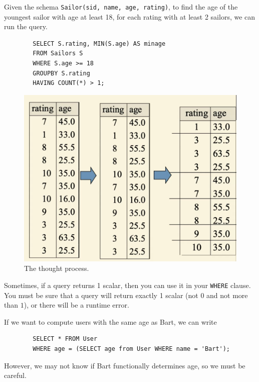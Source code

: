 \documentclass{article}
\begin{document}
    \begin{example}
      Given the schema \texttt{Sailor(sid, name, age, rating)}, to find the age of the youngest sailor with age at least 18, for each rating with at least 2 sailors, we can run the query. 
      \begin{lstlisting}
        SELECT S.rating, MIN(S.age) AS minage 
        FROM Sailors S 
        WHERE S.age >= 18
        GROUPBY S.rating 
        HAVING COUNT(*) > 1; 
      \end{lstlisting}

      \begin{figure}[H]
        \centering 
        \includegraphics[scale=0.4]{img/sailors.png}
        \caption{The thought process.} 
        \label{fig:thought}
      \end{figure}
    \end{example}

    \begin{definition}
      Sometimes, if a query returns 1 scalar, then you can use it in your \texttt{WHERE} clause. You must be sure that a query will return exactly 1 scalar (not $0$ and not more than $1$), or there will be a runtime error.  
    \end{definition}

    \begin{example}
      If we want to compute users with the same age as Bart, we can write 
      \begin{lstlisting}
        SELECT * FROM User 
        WHERE age = (SELECT age from User WHERE name = 'Bart'); 
      \end{lstlisting}
      However, we may not know if Bart functionally determines age, so we must be careful. 
    \end{example}
\end{document}
